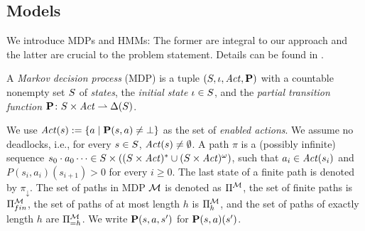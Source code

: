 \documentclass[runningheads]{llncs}
\newcommand{\Distr}{\Delta}
\newcommand{\act}{a}
\newcommand{\defeq}{:=}
\begin{document}
\subsection{Models}
We introduce MDPs and HMMs: The former are integral to our approach and the latter are crucial to the problem statement. Details can be found in \cite{baierPrinciplesModelChecking2008}.


\begin{definition}[MDP]
    A \emph{Markov decision process} (MDP) is a tuple $\left(S, \iota, \mathit{Act}, \mathbf{P} \right)$ with a countable nonempty set  $S$ of \emph{states},  the \emph{initial state} $\iota \in S$, and the \emph{partial transition function} $\ptrans\colon \Sts \times \Act \rightharpoonup \Distr(\Sts)$.
\end{definition}
We use $\Act(s) \defeq \{ \act \mid \ptrans(s, \act) \neq \bot \}$ as the set of \emph{enabled actions}. We assume no deadlocks, i.e., for every $s \in S$, $\mathit{Act}(s) \neq \emptyset$.
A path $\pi$ is a (possibly infinite) sequence $s_0\cdot\act_0\cdots \in \Sts \times ((\Sts \times \Act)^{*} \cup (\Sts \times \Act)^{\omega})$, such that $a_i \in \mathit{Act}(s_i)$ and $P(s_i, a_i)(s_{i+1}) > 0$ for every $i \geq 0$. The last state of a finite path is denoted by $\pi_\downarrow$.
The set of paths in MDP $\mathcal{M}$ is denoted as $\Pi^{\mathcal{M}}$, the set of finite paths is $\Pi_{fin}^{\mathcal{M}}$, the set of paths of at most length $h$ is $\Pi_h^{\mathcal{M}}$, and the set of paths of exactly length $h$ are $\Pi_{=h}^{\mathcal{M}}$. We write $\mathbf{P}(s,a,s')$ for $\mathbf{P}(s,a)(s')$.
\end{document}
